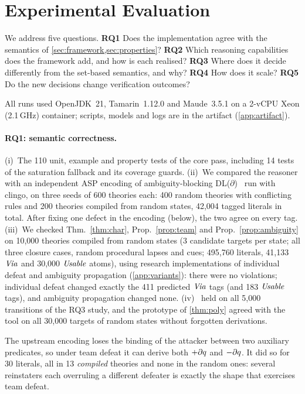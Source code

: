 \section{Experimental Evaluation}
\label{sec:evaluation}

We address five questions. \textbf{RQ1} Does the implementation agree with the semantics of \cref{sec:framework,sec:properties}? \textbf{RQ2} Which reasoning capabilities does the framework add, and how is each realised? \textbf{RQ3} Where does it decide differently from the set-based semantics, and why? \textbf{RQ4} How does it scale? \textbf{RQ5} Do the new decisions change verification outcomes? 

All runs used OpenJDK~21, Tamarin~1.12.0 and Maude~3.5.1 on a 2-vCPU Xeon (2.1\,GHz) container; scripts, models and logs are in the artifact (\cref{app:artifact}).

\paragraph{RQ1: semantic correctness.}
(i)~The 110 unit, example and property tests of the core pass, including 14 tests of the saturation fallback and its coverage guards. (ii)~We compared the reasoner with an independent ASP encoding of ambiguity-blocking DL($\partial$)~\cite{governatori2026ddl} run with clingo, on three seeds of 600 theories each: 400 random theories with conflicting rules and 200 theories compiled from random \forget{} states, 42{,}004 tagged literals in total. After fixing one defect in the encoding (below), the two agree on every tag. (iii)~We checked Thm.~\ref{thm:char}, Prop.~\ref{prop:team} and Prop.~\ref{prop:ambiguity} on 10,000 theories compiled from random states (3 candidate targets per state; all three closure cases, random procedural lapses and cues; 495,760 literals, 41,133 $\mathit{Via}$ and 30,000 $\mathit{Usable}$ atoms), using research implementations of individual defeat and ambiguity propagation (\cref{app:variants}): there were no violations; individual defeat changed exactly the 411 predicted $\mathit{Via}$ tags (and 183 $\mathit{Usable}$ tags), and ambiguity propagation changed none. (iv)~ held on all 5{,}000 transitions of the RQ3 study, and the prototype of \cref{thm:poly} agreed with the tool on all 30{,}000 targets of random states without forgotten derivations.

The upstream encoding loses the binding of the attacker between two auxiliary predicates, so under team defeat it can derive both $+\partial q$ and $-\partial q$. It did so for 30 literals, all in 13 \emph{compiled} theories and none in the random ones: several reinstaters each overruling a different defeater is exactly the shape that exercises team defeat.

